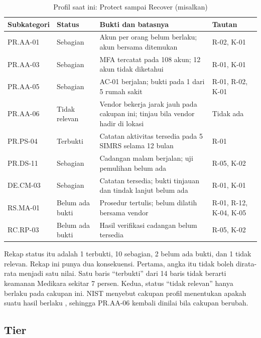 \begin{table}[!htb]
  \centering\small
  \caption{Profil saat ini: Protect sampai Recover (misalkan)}\label{tab:ch06-profil-teknis}
  \begin{tabularx}{\textwidth}{|>{\raggedright\arraybackslash}p{}|>{\raggedright\arraybackslash}p{}|>{\raggedright\arraybackslash}X|>{\raggedright\arraybackslash}p{}|}
    \hline
    \textbf{Subkategori} & \textbf{Status} & \textbf{Bukti dan batasnya} & \textbf{Tautan} \\ \hline
    PR.AA-01 & Sebagian & Akun per orang belum berlaku; akun bersama ditemukan & R-02, K-01 \\ \hline
    PR.AA-03 & Sebagian & MFA tercatat pada 108 akun; 12 akun tidak diketahui & R-01, K-01 \\ \hline
    PR.AA-05 & Sebagian & AC-01 berjalan; bukti pada 1 dari 5 rumah sakit & R-01, R-02, K-01 \\ \hline
    PR.AA-06 & Tidak relevan & Vendor bekerja jarak jauh pada cakupan ini; tinjau bila vendor hadir
    di lokasi & Tidak ada \\ \hline
    PR.PS-04 & Terbukti & Catatan aktivitas tersedia pada 5 SIMRS selama 12 bulan & R-01 \\ \hline
    PR.DS-11 & Sebagian & Cadangan malam berjalan; uji pemulihan belum ada & R-05, K-02 \\ \hline
    DE.CM-03 & Sebagian & Catatan tersedia; bukti tinjauan dan tindak lanjut belum ada & R-01, K-01 \\
    \hline
    RS.MA-01 & Belum ada bukti & Prosedur tertulis; belum dilatih bersama vendor & R-01, R-12, K-04,
    K-05 \\ \hline
    RC.RP-03 & Belum ada bukti & Hasil verifikasi cadangan belum tersedia & R-05, K-02 \\ \hline
  \end{tabularx}
\end{table}

Rekap status itu adalah 1 terbukti, 10 sebagian, 2 belum ada bukti, dan 1 tidak relevan. Rekap ini
punya dua konsekuensi. Pertama, angka itu tidak boleh dirata-rata menjadi satu nilai. Satu baris
``terbukti'' dari 14 baris tidak berarti keamanan Medikara sekitar 7 persen. Kedua, status ``tidak
relevan'' hanya berlaku pada cakupan ini. NIST menyebut cakupan profil menentukan apakah suatu hasil
berlaku \cite{c06-nist-sp1301}, sehingga PR.AA-06 kembali dinilai bila cakupan berubah.

\subsection*{Tier}

